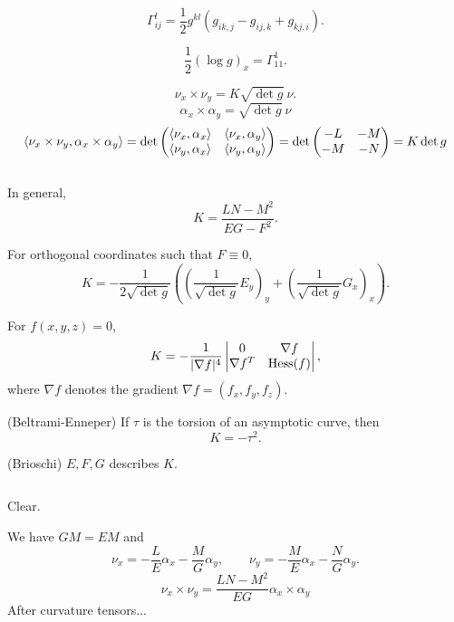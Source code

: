\documentclass{../note}
\def\a{\alpha}
\begin{document}
\begin{thm}
\[\Gamma_{ij}^l=\frac12g^{kl}(g_{ik,j}-g_{ij,k}+g_{kj,i}).\]
\end{thm}

\[\frac12(\log g)_x=\Gamma_{11}^1.\]

\[\nu_x\times\nu_y=K\sqrt{\det g}\ \nu.\]
\[\a_x\times\a_y=\sqrt{\det g}\ \nu\]
\[\<\nu_x\times\nu_y,\a_x\times\a_y\>=\det\mat{\<\nu_x,\a_x\>&\<\nu_x,\a_y\>\\\<\nu_y,\a_x\>&\<\nu_y,\a_y\>}=\det\mat{-L&-M\\-M&-N}=K\det g\]











\begin{thm}
$ $\\[-12pt]
\begin{parts}
\item
In general,
\[K=\frac{LN-M^2}{EG-F^2}.\]
\item
For orthogonal coordinates such that $F\equiv0$,
\[K=-\frac1{2\sqrt{\det g}}\left((\frac1{\sqrt{\det g}}E_y)_y+(\frac1{\sqrt{\det g}}G_x)_x\right).\]
\item
For $f(x,y,z)=0$,
\[K=-\frac1{|\nabla f|^4}\mat[v]{0&\nabla f\\\nabla f^T&\Hess(f)},\]
where $\nabla f$ denotes the gradient $\nabla f=(f_x,f_y,f_z)$.
\item(Beltrami-Enneper) If $\tau$ is the torsion of an asymptotic curve, then
\[K=-\tau^2.\]
\item(Brioschi) $E,F,G$ describes $K$.
\end{parts}
\end{thm}

\begin{pf}$ $\\[-12pt]
\begin{parts}
\item Clear.
\item
We have $GM=EM$ and
\[\nu_x=-\frac LE\a_x-\frac MG\a_y,\qquad\nu_y=-\frac ME\a_x-\frac NG\a_y.\]
\[\nu_x\times\nu_y=\frac{LN-M^2}{EG}\a_x\times\a_y\]
After curvature tensors...
\end{parts}
\end{pf}
\end{document}
